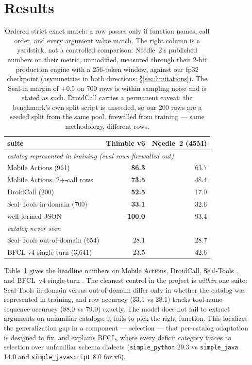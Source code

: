 \documentclass[10pt]{article}
\newcommand{\thimble}{Thimble}
\newcommand{\needle}{Needle~2}
\begin{document}
\section{Results}
\label{sec:results}

\begin{table}[t]
\centering
\small
\begin{tabular}{lrr}
\toprule
suite & \thimble{} v6 & \needle{} (45M)\\
\midrule
\multicolumn{3}{l}{\emph{catalog represented in training (eval rows firewalled out)}}\\
Mobile Actions (961) & \textbf{86.3} & 63.7\\
Mobile Actions, 2+-call rows & \textbf{73.5} & 48.4\\
DroidCall (200) & \textbf{52.5} & 17.0\\
Seal-Tools in-domain (700) & \textbf{33.1} & 32.6\\
well-formed JSON & \textbf{100.0} & 93.4\\
\midrule
\multicolumn{3}{l}{\emph{catalog never seen}}\\
Seal-Tools out-of-domain (654) & 28.1 & 28.7\\
BFCL v4 single-turn (3{,}641) & 23.5 & 42.6\\
\bottomrule
\end{tabular}
\caption{Ordered strict exact match: a row passes only if function names, call
order, and every argument value match. The right column is a yardstick, not a
controlled comparison: \needle{}'s published numbers on their metric,
unmodified, measured through their 2-bit production engine with a 256-token
window, against our fp32 checkpoint (asymmetries in both directions;
\S\ref{sec:limitations}). The Seal-in margin of $+0.5$ on 700 rows is within
sampling noise and is stated as such. DroidCall carries a permanent caveat:
the benchmark's own split script is unseeded, so our 200 rows are a seeded
split from the same pool, firewalled from training --- same methodology,
different rows.}
\label{tab:main}
\end{table}

Table~\ref{tab:main} gives the headline numbers on Mobile Actions, DroidCall,
Seal-Tools \citep{sealtools}, and BFCL~v4 single-turn \citep{bfcl}. The
cleanest control in the project is \emph{within} one suite: Seal-Tools in-domain versus
out-of-domain differ only in whether the catalog was represented in training,
and row accuracy (33.1 vs 28.1) tracks tool-name-sequence accuracy (88.0 vs
79.0) exactly. The model does not fail to extract arguments on unfamiliar
catalogs; it fails to pick the right function. This localizes the
generalization gap in a component --- selection --- that per-catalog
adaptation is designed to fix, and explains BFCL, where every deficit
category traces to selection over unfamiliar schema dialects
(\texttt{simple\_python} 29.3 vs \texttt{simple\_java} 14.0 and
\texttt{simple\_javascript} 8.0 for v6).
\end{document}
